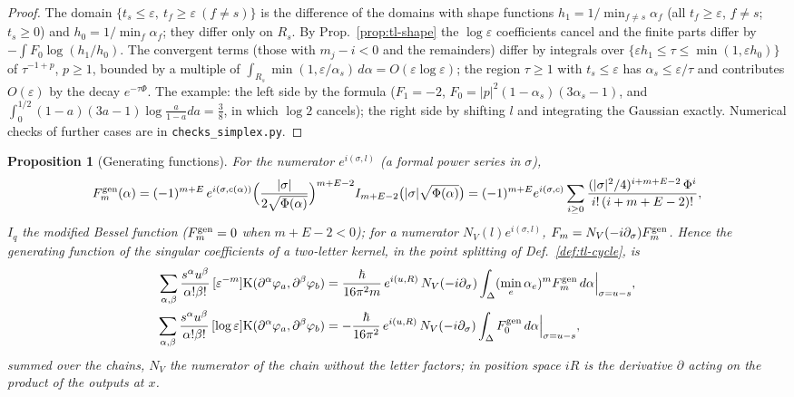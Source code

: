 \documentclass[11pt]{article}
\numberwithin{equation}{section}
\theoremstyle{plain}
\newtheorem{proposition}[theorem]{Proposition}
\theoremstyle{definition}
\begin{document}
\begin{proof}
The domain $\{t_s\le\varepsilon,\ t_f\ge\varepsilon\ (f\ne s)\}$ is the difference of the domains with shape functions $h_1=1/\min_{f\ne s}\alpha_f$ (all $t_f\ge\varepsilon$, $f\ne s$; $t_s\ge0$) and $h_0=1/\min_f\alpha_f$; they differ only on $R_s$. By Prop.~\ref{prop:tl-shape} the $\log\varepsilon$ coefficients cancel and the finite parts differ by $-\int F_0\log(h_1/h_0)$. The convergent terms (those with $m_j-i<0$ and the remainders) differ by integrals over $\{\varepsilon h_1\le\tau\le\min(1,\varepsilon h_0)\}$ of $\tau^{-1+p}$, $p\ge1$, bounded by a multiple of $\int_{R_s}\min(1,\varepsilon/\alpha_s)\,d\alpha=O(\varepsilon\log\varepsilon)$; the region $\tau\ge1$ with $t_s\le\varepsilon$ has $\alpha_s\le\varepsilon/\tau$ and contributes $O(\varepsilon)$ by the decay $e^{-\tau\Phi}$. The example: the left side by the formula ($F_1=-2$, $F_0=|p|^2(1-\alpha_s)(3\alpha_s-1)$, and $\int_0^{1/2}(1-a)(3a-1)\log\frac a{1-a}da=\frac38$, in which $\log2$ cancels); the right side by shifting $l$ and integrating the Gaussian exactly. Numerical checks of further cases are in \texttt{checks\_simplex.py}.
\end{proof}

\begin{proposition}[Generating functions]
\label{prop:tl-genfun}
For the numerator $e^{i(\sigma,l)}$ (a formal power series in $\sigma$),
\begin{equation}
F_m^{\rm gen}(\alpha)=(-1)^{m+E}\,e^{i(\sigma,c(\alpha))}\Big(\frac{|\sigma|}{2\sqrt{\Phi(\alpha)}}\Big)^{m+E-2}I_{m+E-2}\big(|\sigma|\sqrt{\Phi(\alpha)}\big)=(-1)^{m+E}e^{i(\sigma,c)}\sum_{i\ge0}\frac{(|\sigma|^2/4)^{i+m+E-2}\,\Phi^i}{i!\,(i+m+E-2)!},
\label{eq:tl-genfun}
\end{equation}
$I_q$ the modified Bessel function ($F^{\rm gen}_m=0$ when $m+E-2<0$); for a numerator $N_V(l)e^{i(\sigma,l)}$, $F_m=N_V(-i\partial_\sigma)F_m^{\rm gen}$. Hence the generating function of the singular coefficients of a two-letter kernel, in the point splitting of Def.~\ref{def:tl-cycle}, is
\[
\begin{aligned}
\sum_{\alpha,\beta}\frac{s^\alpha u^\beta}{\alpha!\beta!}\,[\varepsilon^{-m}]\mathrm K(\partial^\alpha\varphi_a,\partial^\beta\varphi_b)&=\frac{\hbar}{16\pi^2m}\,e^{i(u,R)}\,N_V(-i\partial_\sigma)\int_\Delta(\min_e\alpha_e)^mF_m^{\rm gen}\,d\alpha\Big|_{\sigma=u-s},\\
\sum_{\alpha,\beta}\frac{s^\alpha u^\beta}{\alpha!\beta!}\,[\log\varepsilon]\mathrm K(\partial^\alpha\varphi_a,\partial^\beta\varphi_b)&=-\frac{\hbar}{16\pi^2}\,e^{i(u,R)}\,N_V(-i\partial_\sigma)\int_\Delta F_0^{\rm gen}\,d\alpha\Big|_{\sigma=u-s},
\end{aligned}
\]
summed over the chains, $N_V$ the numerator of the chain without the letter factors; in position space $iR$ is the derivative $\partial$ acting on the product of the outputs at $x$.
\end{proposition}
\end{document}
